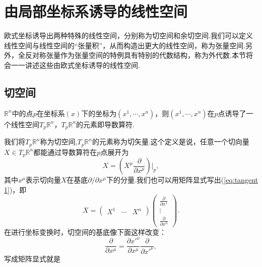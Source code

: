 \section{由局部坐标系诱导的线性空间}
    欧式坐标诱导出两种特殊的线性空间，分别称为切空间和余切空间.我们可以定义线性空间与线性空间的“张量积”，从而构造出更大的线性空间，称为张量空间.另外，全反对称张量作为张量空间的特例具有特别的代数结构，称为外代数.本节将会一一讲述这些由欧式坐标诱导的线性空间.
    \subsection{切空间}
        \begin{definition}
            $\mathbb{R}^n$中的点$p$在坐标系$(x)$下的坐标为$(x^1,\cdots,x^n)$，则$(x^1,\cdots,x^n)$在$p$点诱导了一个线性空间$T_p\mathbb{R}^n$，$T_p\mathbb{R}^n$的元素即导数算符.
        \end{definition}
        我们将$T_p\mathbb{R}^n$称为切空间,$T_p\mathbb{R}^n$的元素称为切矢量.这个定义是说，任意一个切向量$X\in T_p\mathbb{R}^n$都能通过导数算符在$p$点展开为
        \begin{equation}\label{eq:tangent 1}
            X=\left(X^\mu\frac{\partial}{\partial x^\mu}\right)\Bigg|_p,
        \end{equation}
        其中$x^\mu$表示切向量$X$在基底$\partial/\partial x^\mu$下的分量.我们也可以用矩阵显式写出(\ref{eq:tangent 1})，即
        \begin{equation}\label{eq:tangent 2}
            X=
            \begin{pmatrix}
                X^1&\cdots&X^n	
            \end{pmatrix}
            \begin{pmatrix}
                \frac{\partial}{\partial x^1}\\
                \vdots\\
                \frac{\partial}{\partial x^n}	
            \end{pmatrix}.
        \end{equation}
        在进行坐标变换时，切空间的基底像下面这样改变：
        \begin{equation}\label{eq:tangent 3}
            \frac{\partial}{\partial x^\mu}=\frac{\partial x'^\nu}{\partial x^\mu}\frac{\partial}{\partial x'^\nu},
        \end{equation}
        写成矩阵显式就是
